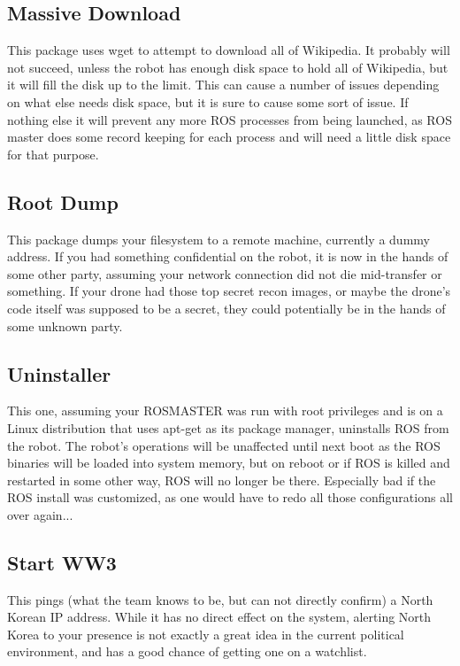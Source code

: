 \documentclass[IEEEtran,letterpaper,10pt,notitlepage,draftclsnofoot,onecolumn]{article}
\begin{document}
\subsection{Massive Download}
This package uses wget to attempt to download all of Wikipedia.
It probably will not succeed, unless the robot has enough disk space to hold all of Wikipedia, but it will fill the disk up to 
the limit. This can cause a number of issues depending on what else needs disk space, but it is sure to cause some sort of 
issue. If nothing else it will prevent any more ROS processes from being launched, as ROS master does some record keeping for 
each process and will need a little disk space for that purpose.

\subsection{Root Dump}
This package dumps your filesystem to a remote machine, currently a dummy address. If you had something confidential on the
robot, it is now in the hands of some other party, assuming your network connection did not die mid-transfer or something.
If your drone had those top secret recon images, or maybe the drone's code itself was supposed to be a secret, they could
potentially be in the hands of some unknown party.

\subsection{Uninstaller}
This one, assuming your ROSMASTER was run with root privileges and is on a Linux distribution that uses apt-get as its package
manager, uninstalls ROS from the robot. The robot's operations will be unaffected until next boot as the ROS binaries will be 
loaded into system memory, but on reboot or if ROS is killed and restarted in some other way, ROS will no longer be there.
Especially bad if the ROS install was customized, as one would have to redo all those configurations all over again...

\subsection{Start WW3}
This pings (what the team knows to be, but can not directly confirm) a North Korean IP address. 
While it has no direct effect on the system, alerting North Korea to your presence is not exactly a great idea in the current political environment, and has a good chance of getting one on a watchlist. 
\end{document}
